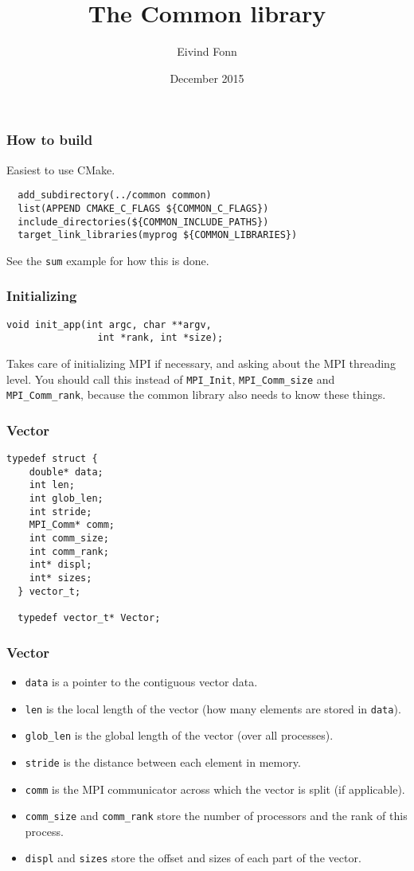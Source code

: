 

\title{The Common library}
\author{Eivind Fonn}
\date{December 2015}
\maketitle

\begin{frame}[fragile]
  \frametitle{How to build}
  Easiest to use CMake.
\begin{lstlisting}
  add_subdirectory(../common common)
  list(APPEND CMAKE_C_FLAGS ${COMMON_C_FLAGS})
  include_directories(${COMMON_INCLUDE_PATHS})
  target_link_libraries(myprog ${COMMON_LIBRARIES})
\end{lstlisting}
  See the \texttt{sum} example for how this is done.
\end{frame}

\begin{frame}[fragile]
  \frametitle{Initializing}
\begin{lstlisting}[style=c]
  void init_app(int argc, char **argv,
                int *rank, int *size);
\end{lstlisting}
  Takes care of initializing MPI if necessary, and asking about the MPI
  threading level. You should call this instead of \texttt{MPI\_Init},
  \texttt{MPI\_Comm\_size} and \texttt{MPI\_Comm\_rank}, because the common
  library also needs to know these things.
\end{frame}

\begin{frame}[fragile]
  \frametitle{Vector}
\begin{lstlisting}[style=c]
  typedef struct {
    double* data;
    int len;
    int glob_len;
    int stride;
    MPI_Comm* comm;
    int comm_size;
    int comm_rank;
    int* displ;
    int* sizes;
  } vector_t;

  typedef vector_t* Vector;
\end{lstlisting}
\end{frame}

\begin{frame}[fragile]
  \frametitle{Vector}
  \begin{itemize}
  \item \texttt{data} is a pointer to the contiguous vector data.
  \item \texttt{len} is the local length of the vector (how many elements are
    stored in \texttt{data}).
  \item \texttt{glob\_len} is the global length of the vector (over all
    processes).
  \item \texttt{stride} is the distance between each element in memory.
  \item \texttt{comm} is the MPI communicator across which the vector is split
    (if applicable).
  \item \texttt{comm\_size} and \texttt{comm\_rank} store the number of
    processors and the rank of this process.
  \item \texttt{displ} and \texttt{sizes} store the offset and sizes of each
    part of the vector.
  \end{itemize}
\end{frame}

